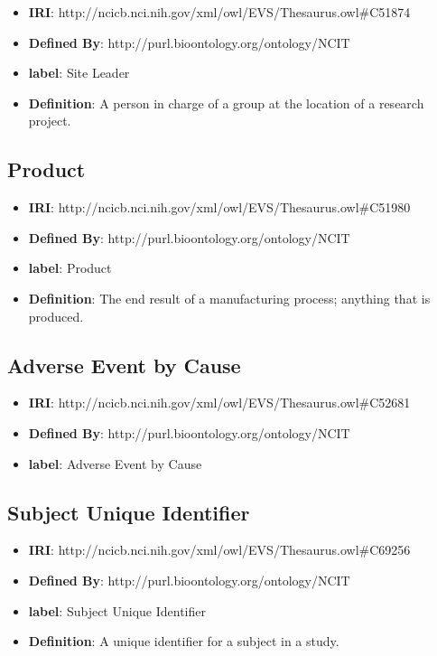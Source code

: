 \documentclass[a4paper,12pt,oneside]{article}
\begin{document}
  \begin{itemize}
     \item \textbf{IRI}: http://ncicb.nci.nih.gov/xml/owl/EVS/Thesaurus.owl\#C51874
     \item \textbf{Defined By}: http://purl.bioontology.org/ontology/NCIT
     \item \textbf{label}: Site Leader
     \item \textbf{Definition}: A person in charge of a group at the location of a research project.
  \end{itemize}


  \subsection{Product}

  \begin{itemize}
     \item \textbf{IRI}: http://ncicb.nci.nih.gov/xml/owl/EVS/Thesaurus.owl\#C51980
     \item \textbf{Defined By}: http://purl.bioontology.org/ontology/NCIT
     \item \textbf{label}: Product
     \item \textbf{Definition}: The end result of a manufacturing process; anything that is produced.
  \end{itemize}


  \subsection{Adverse Event by Cause}

  \begin{itemize}
     \item \textbf{IRI}: http://ncicb.nci.nih.gov/xml/owl/EVS/Thesaurus.owl\#C52681
     \item \textbf{Defined By}: http://purl.bioontology.org/ontology/NCIT
     \item \textbf{label}: Adverse Event by Cause
  \end{itemize}


  \subsection{Subject Unique Identifier}

  \begin{itemize}
     \item \textbf{IRI}: http://ncicb.nci.nih.gov/xml/owl/EVS/Thesaurus.owl\#C69256
     \item \textbf{Defined By}: http://purl.bioontology.org/ontology/NCIT
     \item \textbf{label}: Subject Unique Identifier
     \item \textbf{Definition}: A unique identifier for a subject in a study.
  \end{itemize}
\end{document}
